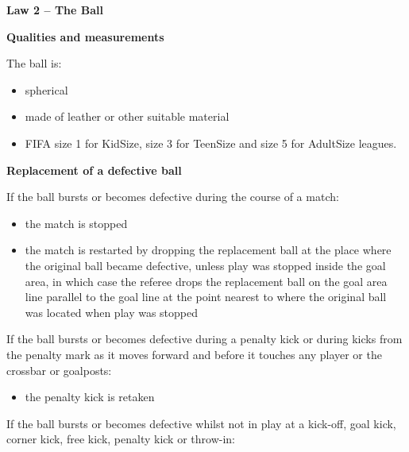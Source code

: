 \clearpage
\sffamily
{\bfseries\color[rgb]{0.4,0.4,0.4}
Law 2 -- The Ball}
{}


\bigskip

{\bfseries Qualities and measurements }

\headlinebox

The ball is:

\begin{itemize}
\item spherical
\item made of leather or other suitable material
\item FIFA size 1 for KidSize, size 3 for TeenSize and size 5 for AdultSize leagues. 
\end{itemize}

{\bfseries Replacement of a defective ball }

\headlinebox

If the ball bursts or becomes defective during the course of a match:

\begin{itemize}
\item the match is stopped
\item the match is restarted by dropping the replacement ball at the place where the original ball became defective, unless play was stopped inside the goal area, in which case the referee drops the replacement ball on the goal area line parallel to the goal line at the point
nearest to where the original ball was located when play was stopped
\end{itemize}

If the ball bursts or becomes defective during a penalty kick or during kicks from the penalty mark as it moves forward and before it touches any player or the crossbar or goalposts: 

\begin{itemize}
\item the penalty kick is retaken
\end{itemize}

If the ball bursts or becomes defective whilst not in play at a kick-off, goal kick, corner kick, free kick, penalty kick or throw-in:

